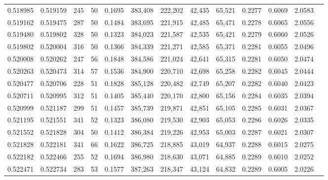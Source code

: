 \begin{tabular}{rrrrrrrrrrrrr}
0.518985 & 0.519159 &   245 &  50 &                                     0.1695 & 383,408 & 222,202 &  42,435 &  65,521 & 0.2277 & 0.6069 & 2.0583 \\
0.519162 & 0.519475 &   287 &  50 &                                     0.1484 & 383,695 & 221,915 &  42,485 &  65,471 & 0.2278 & 0.6065 & 2.0556 \\
0.519480 & 0.519802 &   328 &  50 &                                     0.1323 & 384,023 & 221,587 &  42,535 &  65,421 & 0.2279 & 0.6060 & 2.0526 \\
0.519802 & 0.520004 &   316 &  50 &                                     0.1366 & 384,339 & 221,271 &  42,585 &  65,371 & 0.2281 & 0.6055 & 2.0496 \\
0.520008 & 0.520262 &   247 &  56 &                                     0.1848 & 384,586 & 221,024 &  42,641 &  65,315 & 0.2281 & 0.6050 & 2.0474 \\
0.520263 & 0.520473 &   314 &  57 &                                     0.1536 & 384,900 & 220,710 &  42,698 &  65,258 & 0.2282 & 0.6045 & 2.0444 \\
0.520477 & 0.520706 &   228 &  51 &                                     0.1828 & 385,128 & 220,482 &  42,749 &  65,207 & 0.2282 & 0.6040 & 2.0423 \\
0.520711 & 0.520995 &   312 &  51 &                                     0.1405 & 385,440 & 220,170 &  42,800 &  65,156 & 0.2284 & 0.6035 & 2.0394 \\
0.520999 & 0.521187 &   299 &  51 &                                     0.1457 & 385,739 & 219,871 &  42,851 &  65,105 & 0.2285 & 0.6031 & 2.0367 \\
0.521195 & 0.521551 &   341 &  52 &                                     0.1323 & 386,080 & 219,530 &  42,903 &  65,053 & 0.2286 & 0.6026 & 2.0335 \\
0.521552 & 0.521828 &   304 &  50 &                                     0.1412 & 386,384 & 219,226 &  42,953 &  65,003 & 0.2287 & 0.6021 & 2.0307 \\
0.521828 & 0.522181 &   341 &  66 &                                     0.1622 & 386,725 & 218,885 &  43,019 &  64,937 & 0.2288 & 0.6015 & 2.0275 \\
0.522182 & 0.522466 &   255 &  52 &                                     0.1694 & 386,980 & 218,630 &  43,071 &  64,885 & 0.2289 & 0.6010 & 2.0252 \\
0.522471 & 0.522734 &   283 &  53 &                                     0.1577 & 387,263 & 218,347 &  43,124 &  64,832 & 0.2289 & 0.6005 & 2.0226 \\

\end{tabular}

